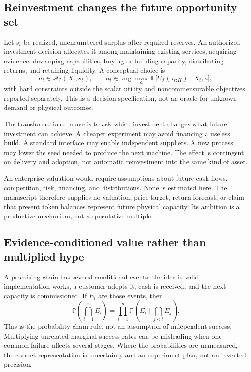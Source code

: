 \documentclass[11pt,letterpaper]{article}
\newcommand{\I}{\mathcal I}\newcommand{\A}{\mathcal A}
\newcommand{\E}{\mathbb E}\newcommand{\Prob}{\mathbb P}
\newcommand{\1}{\mathbf 1}
\theoremstyle{remark}\newtheorem{remark}{Remark}[section]
\begin{document}
\subsection{Reinvestment changes the future opportunity set}
Let $s_t$ be realized, unencumbered surplus after required reserves. An authorized investment decision allocates it among maintaining existing services, acquiring evidence, developing capabilities, buying or building capacity, distributing returns, and retaining liquidity. A conceptual choice is
\begin{equation}\label{eq:investment}
 a_t\in\A_{\I}(X_t,s_t),\qquad
 a_t\in\arg\max_a\ \E\bigl[U_{\I}(\tau_{t:H})\mid X_t,a\bigr],
\end{equation}
with hard constraints outside the scalar utility and noncommensurable objectives reported separately. This is a decision specification, not an oracle for unknown demand or physical outcomes.

The transformational move is to ask which investment changes what future investment can achieve. A cheaper experiment may avoid financing a useless build. A standard interface may enable independent suppliers. A new process may lower the seed needed to produce the next machine. The effect is contingent on delivery and adoption, not automatic reinvestment into the same kind of asset.

An enterprise valuation would require assumptions about future cash flows, competition, risk, financing, and distributions. None is estimated here. The manuscript therefore supplies no valuation, price target, return forecast, or claim that present token balances represent future physical capacity. Its ambition is a productive mechanism, not a speculative multiple.

\subsection{Evidence-conditioned value rather than multiplied hype}
A promising chain has several conditional events: the idea is valid, implementation works, a customer adopts it, cash is received, and the next capacity is commissioned. If $E_i$ are those events, then
\begin{equation}
 \Prob\!\left(\bigcap_{i=1}^{n}E_i\right)
 =\prod_{i=1}^{n}\Prob\!\left(E_i\mid\bigcap_{j<i}E_j\right).
\end{equation}
This is the probability chain rule, not an assumption of independent success. Multiplying unrelated marginal success rates can be misleading when one common failure affects several stages. Where the probabilities are unmeasured, the correct representation is uncertainty and an experiment plan, not an invented precision.
\end{document}
